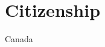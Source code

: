 \documentclass[11pt]{article} %
\begin{document}
%
%
%


\section*{Citizenship}

Canada

%
%



\vfill %
\end{document}

